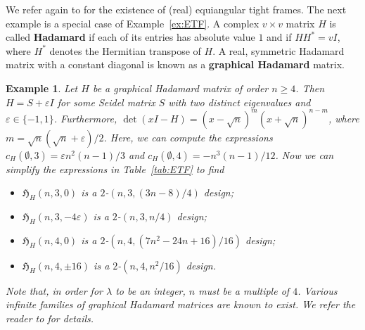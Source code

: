 \documentclass[11pt]{article}
\newtheorem{example}[theorem]{Example}
\begin{document}
We refer again to \cite{etf} for the existence of (real) equiangular tight frames.
The next example is a special case of Example~\ref{ex:ETF}.
A complex $v \times v$ matrix $H$ is called \textbf{Hadamard} if each of its entries has absolute value $1$ and if $H H^* = vI$, where $H^*$ denotes the Hermitian transpose of $H$.
A real, symmetric Hadamard matrix with a constant diagonal is known as a \textbf{graphical Hadamard} matrix.

\begin{example}\label{ex:graphHadamard}
Let $H$ be a graphical Hadamard matrix of order $n \geqslant 4$.
Then $H=S+\varepsilon I$ for some Seidel matrix $S$ with two distinct eigenvalues and $\varepsilon \in \{-1,1\}$.
Furthermore, $\det(xI-H) = (x-\sqrt{n})^{m}(x+\sqrt{n})^{n-m}$, where $m = \sqrt{n}(\sqrt{n}+\varepsilon)/2$.
Here, we can compute the expressions $c_H(\emptyset,3) = \varepsilon n^2(n-1)/3$ and $c_H(\emptyset,4) = -n^3(n-1)/12$.
Now we can simplify the expressions in Table~\ref{tab:ETF} to find
\begin{itemize}
    \item $\mathfrak H_{H}(n,3,0)$ is a $2$-$(n,3,(3n-8)/4)$ design;
    \item $\mathfrak H_{H}(n,3,-4\varepsilon)$ is a $2$-$(n,3,n/4)$ design;
    \item $\mathfrak H_{H}(n,4,0)$ is a $2$-$(n,4,(7n^2-24n+16)/16)$ design;
    \item  $\mathfrak H_{H}(n,4,\pm 16)$ is a $2$-$(n,4,n^2/16)$ design.
\end{itemize}

Note that, in order for $\lambda$ to be an integer, $n$ must be a multiple of $4$.
Various infinite families of graphical Hadamard matrices are known to exist.
We refer the reader to \cite{BrouwerBlokhuis60} for details.
\end{example}
\end{document}
